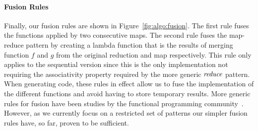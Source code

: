 \paragraph{Fusion Rules}
Finally, our fusion rules are shown in Figure~\ref{fig:algo:fusion}.
The first rule fuses the functions applied by two consecutive maps.
The second rule fuses the map-reduce pattern by creating a lambda function that is the results of merging function $f$ and $g$ from the original reduction and map respectively.
This rule only applies to the sequential version since this is the only implementation not requiring the associativity property required by the more generic $\textit{reduce}$ pattern.
When generating code, these rules in effect allow us to fuse the implementation of the different functions and avoid having to store temporary results.
More generic rules for fusion have been studies by the functional programming community~\cite{coutts07streamfusion,jones01playing}.
However, as we currently focus on a restricted set of patterns our simpler fusion rules have, so far, proven to be sufficient.



